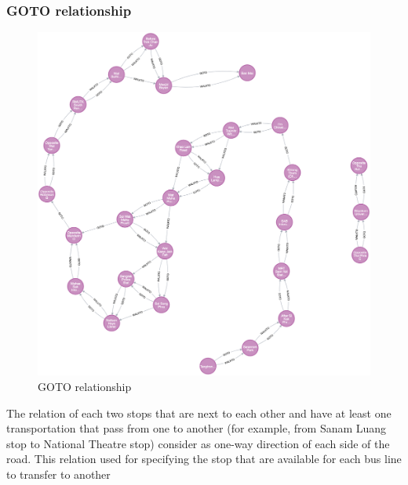 \subsubsection{GOTO relationship}
\begin{figure}[!h]
	\centering
	\includegraphics[width=1\linewidth]{chapter3/goto_relationship.png}
	\caption{GOTO relationship}
	\label{fig:GOTO relationship}
\end{figure}
The relation of each two stops that are next to each other and have at least one transportation that pass from one to another (for example, from Sanam Luang stop to National Theatre stop) consider as one-way direction of each side of the road. This relation used for specifying the stop that are available for each bus line to transfer to another

\newpage
